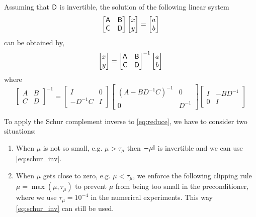 \begin{remark}
Assuming that $\mathsf{D}$ is invertible, the solution of the following linear system 
\begin{equation*}
\begin{bmatrix}
\mathsf{A}  & \mathsf{B} \\
\mathsf{C}  & \mathsf{D} 
\end{bmatrix} 
\begin{bmatrix}
x \\ y
\end{bmatrix}
= 
\begin{bmatrix}
a \\ b
\end{bmatrix}
\end{equation*}
can be obtained by, 
\begin{equation*}
\begin{bmatrix}
x \\ y
\end{bmatrix}=
\begin{bmatrix}
\mathsf{A}  & \mathsf{B} \\
\mathsf{C}  & \mathsf{D} 
\end{bmatrix} ^{-1}
\begin{bmatrix}
a \\ b
\end{bmatrix}
\end{equation*}
where 
\begin{equation}\label{eq:schur_inv}
\begin{bmatrix}
A & B \\ C & D 
\end{bmatrix} ^{-1}
= \begin{bmatrix}
I  & 0 \\
-D^{-1}C  & I 
\end{bmatrix}
 \begin{bmatrix}
( A-BD^{-1}C )^{-1}   &  0 \\
 0   & D^{-1} 
\end{bmatrix}
\begin{bmatrix}
I  &   -BD^{-1} \\
0  &  I 
\end{bmatrix}
\end{equation}
\end{remark}
To apply the Schur complement inverse to \eqref{eq:reduce}, we have to consider two situations: 
\begin{enumerate}
\item When $\mu$ is not so small, e.g. $\mu > \tau_{\mu}$ then $- \mu \mathsf{I}$ is invertible and we can use \eqref{eq:schur_inv}. 
\item When $\mu$ gets close to zero, e.g. $\mu < \tau_{\mu}$, we enforce the following clipping rule $\mu = \max(\mu, \tau_{\mu}) $ 
to prevent $\mu$ from being too small in the preconditioner, where we use $\tau_{\mu} = 10^{-4}$ in the numerical experiments. This way \eqref{eq:schur_inv} can still be used.
\end{enumerate}
